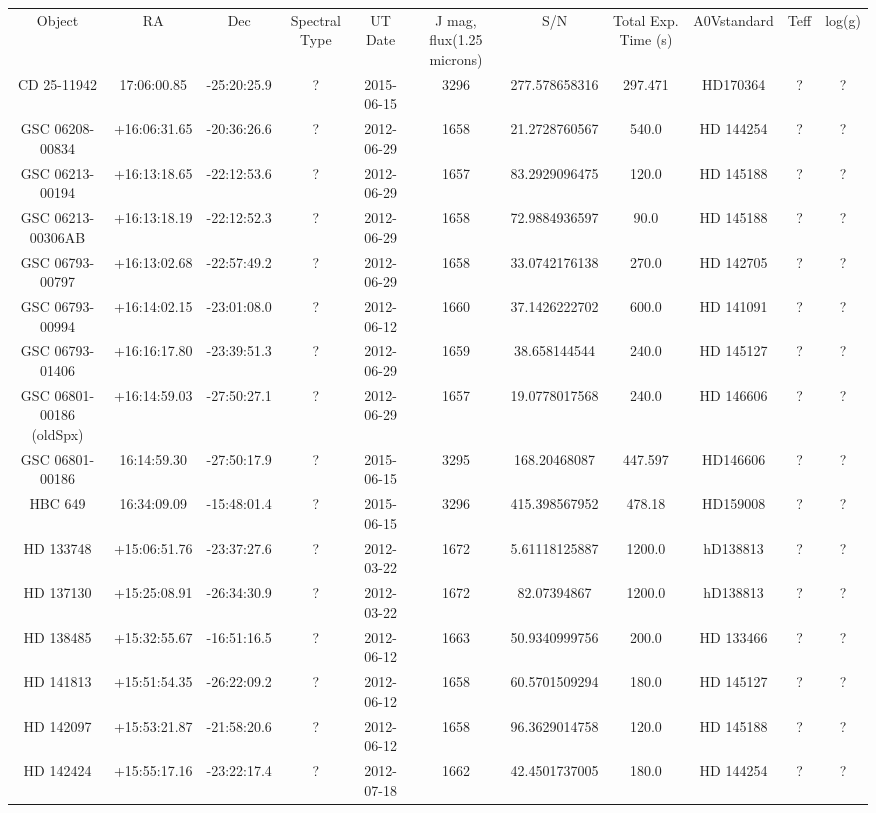 \begin{table}
\begin{tabular}{ccccccccccc}
Object & RA & Dec & Spectral Type & UT Date & J mag, flux(1.25 microns) & S/N & Total Exp. Time (s) & A0Vstandard & Teff & log(g) \\
CD 25-11942 & 17:06:00.85 & -25:20:25.9 & ? & 2015-06-15 & 3296 & 277.578658316 & 297.471 & HD170364 & ? & ? \\
GSC 06208-00834 & +16:06:31.65 & -20:36:26.6 & ? & 2012-06-29 & 1658 & 21.2728760567 & 540.0 & HD 144254 & ? & ? \\
GSC 06213-00194 & +16:13:18.65 & -22:12:53.6 & ? & 2012-06-29 & 1657 & 83.2929096475 & 120.0 & HD 145188 & ? & ? \\
GSC 06213-00306AB & +16:13:18.19 & -22:12:52.3 & ? & 2012-06-29 & 1658 & 72.9884936597 & 90.0 & HD 145188 & ? & ? \\
GSC 06793-00797 & +16:13:02.68 & -22:57:49.2 & ? & 2012-06-29 & 1658 & 33.0742176138 & 270.0 & HD 142705 & ? & ? \\
GSC 06793-00994 & +16:14:02.15 & -23:01:08.0 & ? & 2012-06-12 & 1660 & 37.1426222702 & 600.0 & HD 141091 & ? & ? \\
GSC 06793-01406 & +16:16:17.80 & -23:39:51.3 & ? & 2012-06-29 & 1659 & 38.658144544 & 240.0 & HD 145127 & ? & ? \\
GSC 06801-00186 (oldSpx) & +16:14:59.03 & -27:50:27.1 & ? & 2012-06-29 & 1657 & 19.0778017568 & 240.0 & HD 146606 & ? & ? \\
GSC 06801-00186 & 16:14:59.30 & -27:50:17.9 & ? & 2015-06-15 & 3295 & 168.20468087 & 447.597 & HD146606 & ? & ? \\
HBC 649 & 16:34:09.09 & -15:48:01.4 & ? & 2015-06-15 & 3296 & 415.398567952 & 478.18 & HD159008 & ? & ? \\
HD 133748 & +15:06:51.76 & -23:37:27.6 & ? & 2012-03-22 & 1672 & 5.61118125887 & 1200.0 & hD138813 & ? & ? \\
HD 137130 & +15:25:08.91 & -26:34:30.9 & ? & 2012-03-22 & 1672 & 82.07394867 & 1200.0 & hD138813 & ? & ? \\
HD 138485 & +15:32:55.67 & -16:51:16.5 & ? & 2012-06-12 & 1663 & 50.9340999756 & 200.0 & HD 133466 & ? & ? \\
HD 141813 & +15:51:54.35 & -26:22:09.2 & ? & 2012-06-12 & 1658 & 60.5701509294 & 180.0 & HD 145127 & ? & ? \\
HD 142097 & +15:53:21.87 & -21:58:20.6 & ? & 2012-06-12 & 1658 & 96.3629014758 & 120.0 & HD 145188 & ? & ? \\
HD 142424 & +15:55:17.16 & -23:22:17.4 & ? & 2012-07-18 & 1662 & 42.4501737005 & 180.0 & HD 144254 & ? & ? \\

\end{tabular}
\end{table}
